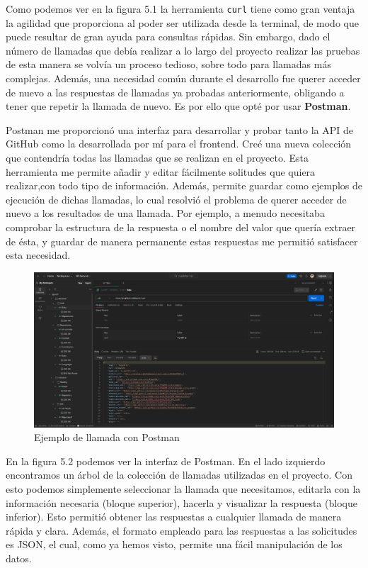 \documentclass[a4paper, 12pt]{book}
\begin{document}
Como podemos ver en la figura 5.1 la herramienta \texttt{curl} tiene como gran ventaja la agilidad que proporciona al poder ser utilizada desde la terminal, de modo que puede resultar de gran ayuda para consultas rápidas. Sin embargo, dado el número de llamadas que debía realizar a lo largo del proyecto realizar las pruebas de esta manera se volvía un proceso tedioso, sobre todo para llamadas más complejas. Además, una necesidad común durante el desarrollo fue querer acceder de nuevo a las respuestas de llamadas ya probadas anteriormente, obligando a tener que repetir la llamada de nuevo. Es por ello que opté por usar \textbf{Postman}.

Postman me proporcionó una interfaz para desarrollar y probar tanto la API de GitHub como la desarrollada por mí para el frontend. Creé una nueva colección que contendría todas las llamadas que se realizan en el proyecto. Esta herramienta me permite añadir y editar fácilmente solitudes que quiera realizar,con todo tipo de información. Además, permite guardar como ejemplos de ejecución de dichas llamadas, lo cual resolvió el problema de querer acceder de nuevo a los resultados de una llamada. Por ejemplo, a menudo necesitaba comprobar la estructura de la respuesta o el nombre del valor que quería extraer de ésta, y guardar de manera permanente estas respuestas me permitió satisfacer esta necesidad.

\vspace{2em}

\begin{figure}[H]
    \centering
    \includegraphics[width=\textwidth]{img/postman.png}
    \caption{Ejemplo de llamada con Postman}
    \label{fig:postman}
\end{figure}
\clearpage

En la figura 5.2 podemos ver la interfaz de Postman. En el lado izquierdo encontramos un árbol de la colección de llamadas utilizadas en el proyecto. Con esto podemos simplemente seleccionar la llamada que necesitamos, editarla con la información necesaria (bloque superior), hacerla y visualizar la respuesta (bloque inferior). Esto permitió obtener las respuestas a cualquier llamada de manera rápida y clara. Además, el formato empleado para las respuestas a las solicitudes es JSON, el cual, como ya hemos visto, permite una fácil manipulación de los datos.
\end{document}
